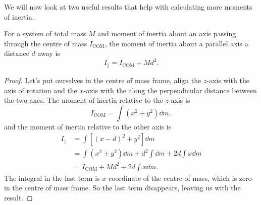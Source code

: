 \documentclass[../classical_mechanics.tex]{subfiles}
\begin{document}
        We will now look at two useful results that help with calculating more moments of inertia.
        \begin{theorem}
            For a system of total mass $M$ and moment of inertia about an axis passing through the centre of mass $I_\text{COM}$, the moment of inertia about a parallel axis a distance $d$ away is
            \begin{equation}
                I_\parallel=I_\text{COM}+Md^2.
            \end{equation}
        \end{theorem}
        \begin{proof}
            Let's put ourselves in the centre of mass frame, align the $z$-axis with the axis of rotation and the $x$-axis with the along the perpendicular distance between the two axes.
            The moment of inertia relative to the $z$-axis is
            \begin{equation}
                I_\text{COM}=\int(x^2+y^2)\dd{m},
            \end{equation}
            and the moment of inertia relative to the other axis is
            \begin{align}
                I_\parallel&=\int[(x-d)^2+y^2]\dd{m}\\
                &=\int(x^2+y^2)\dd{m}+d^2\int\dd{m}+2d\int x\dd{m}\\
                &=I_\text{COM}+Md^2+2d\int x\dd{m}.
            \end{align}
            The integral in the last term is $x$ coordinate of the centre of mass, which is zero in the centre of mass frame.
            So the last term disappears, leaving us with the result.
        \end{proof}
\end{document}
